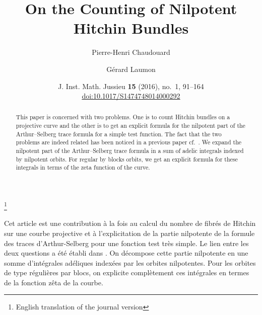 \newenvironment{paragr}[1][]%
  {\medskip\refstepcounter{subsection}%
   \noindent\textbf{\thesubsection.\ #1}\ignorespaces}%
  {\medskip}


\theoremstyle{plain}
\newtheorem{theoreme}{Theorem}[subsection]
\newtheorem{lemme}[theoreme]{Lemma}
\newtheorem{proposition}[theoreme]{Proposition}
\newtheorem{corollaire}[theoreme]{Corollary}
\theoremstyle{definition}
\newtheorem{definition}[theoreme]{Definition}
\newtheorem{remarque}[theoreme]{Remark}
\newtheorem{hypothese}[theoreme]{Hypothesis}

\newenvironment{preuve}{\begin{proof}}{\end{proof}}

\title[On the Counting of Nilpotent Hitchin Bundles]{On the Counting of Nilpotent Hitchin Bundles}
\author{Pierre-Henri Chaudouard \and G\'erard Laumon}
\thanks{English translation of the journal version}
\date{J. Inst. Math. Jussieu \textbf{15} (2016), no.~1, 91--164\\
  \href{https://doi.org/10.1017/S1474748014000292}{doi:10.1017/S1474748014000292}}



\begin{abstract}
This paper is concerned with two problems. One is to count Hitchin bundles on a projective curve and the other is to get an explicit formula for the nilpotent part of the Arthur--Selberg trace formula for a simple test function. The fact that the two problems are indeed related has been noticed in a previous paper cf.\ \cite{scfh}. We expand the nilpotent part of the Arthur--Selberg trace formula in a sum of adelic integrals indexed by nilpotent orbits. For \og regular by blocks\fg{} orbits, we get an explicit formula for these integrals in terms of the zeta function of the curve.
\end{abstract}

\begin{altabstract}
Cet article est une contribution \`{a} la fois au calcul du nombre de fibr\'{e}s de Hitchin sur une courbe projective et \`{a} l'explicitation de la partie nilpotente de la formule des traces d'Arthur-Selberg pour une fonction test tr\`{e}s simple. Le lien entre les deux questions a \'{e}t\'{e} \'{e}tabli dans \cite{scfh}. On d\'{e}compose cette partie nilpotente en une somme d'int\'{e}grales ad\'{e}liques index\'{e}es par les orbites nilpotentes. Pour les orbites de type \og r\'{e}guli\`{e}res par blocs\fg{}, on explicite compl\`{e}tement ces int\'{e}grales en termes de la fonction z\^{e}ta de la courbe.
\end{altabstract}


